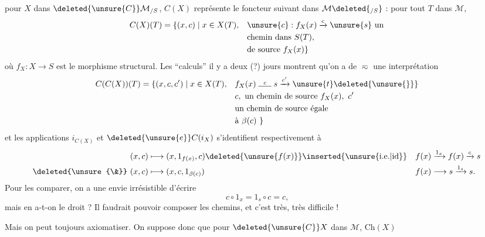 pour $X$ dans $\deleted{\unsure{C}}\mathcal M_{/S}$, $C(X)$ représente le foncteur suivant dans $\mathcal M\deleted{_{/S}}$ : pour tout $T$ dans $\mathcal M$,
\[
\begin{aligned}
C(X)(T)=\{(x,c)\mid x\in X(T),\quad &\unsure{c}:f_X(x)\xrightarrow{c}\unsure{s}\ \text{un}\\
&\text{chemin dans }S(T),\\
&\text{de source } f_X(x)\}
\end{aligned}
\]
où $f_X:X\longrightarrow S$ est le morphisme structural. Les ``calculs''  il y a deux (?) jours montrent qu'on a de $\eqsim$ une interprétation
\[
\begin{aligned}
C(C(X))(T)=\{(x,c,c')\mid x\in X(T),\quad &f_X(x)\mathrel{\overset{c}{\rule{1.6em}{.4pt}}}s\xrightarrow{c'}\unsure{t}\deleted{\unsure{\}}}\\
&c,\text{ un chemin de source }f_X(x),\ c'\\
&\text{un chemin de source égale}\\
&\text{à }\beta(c)\ \}
\end{aligned}
\]
et les applications $i_{C(X)}$ et $\deleted{\unsure{e}}C(i_X)$ s'identifient respectivement à
\[
\begin{aligned}
(x,c)&\longmapsto(x,1_{f(x)},c)\deleted{\unsure{f(x)}}\inserted{\unsure{\text{i.e.}|\mathrm{id}}} && f(x)\xrightarrow{1_x}f(x)\xrightarrow{c}s\\
\deleted{\unsure{\&}}\ (x,c)&\longmapsto(x,c,1_{\beta(c)}) && f(x)\longrightarrow s\xrightarrow{1_s}s\text{.}
\end{aligned}
\]
Pour les comparer, on a une envie irrésistible d'écrire
\[
c\circ1_x=1_s\circ c=c\text{,}
\]
mais en a-t-on le droit ? Il faudrait pouvoir composer les chemins, et c'est très, très difficile !

Mais on peut toujours axiomatiser. On suppose donc que pour $\deleted{\unsure{C}}X$ dans $\mathcal M$, $\mathrm{Ch}(X)$

